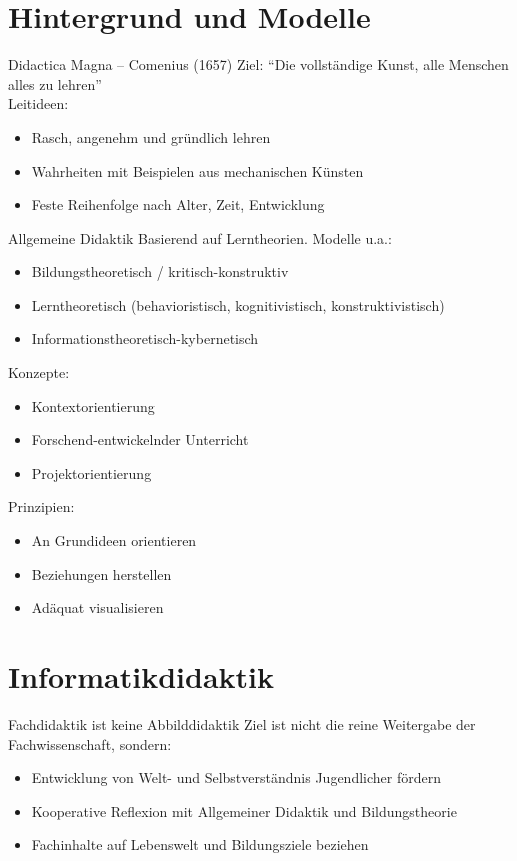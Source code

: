 \documentclass{article}
\begin{document}
\section{Hintergrund und Modelle}
\begin{block}{Didactica Magna – Comenius (1657)}
    Ziel: ``Die vollständige Kunst, alle Menschen alles zu lehren'' \\
    Leitideen:
    \begin{itemize}
        \item Rasch, angenehm und gründlich lehren
        \item Wahrheiten mit Beispielen aus mechanischen Künsten
        \item Feste Reihenfolge nach Alter, Zeit, Entwicklung
    \end{itemize}
\end{block}

\begin{block}{Allgemeine Didaktik}
    Basierend auf Lerntheorien. Modelle u.a.:
    \begin{itemize}
        \item Bildungstheoretisch / kritisch-konstruktiv
        \item Lerntheoretisch (behavioristisch, kognitivistisch, konstruktivistisch)
        \item Informationstheoretisch-kybernetisch
    \end{itemize}
    Konzepte:
    \begin{itemize}
        \item Kontextorientierung
        \item Forschend-entwickelnder Unterricht
        \item Projektorientierung
    \end{itemize}
    Prinzipien:
    \begin{itemize}
        \item An Grundideen orientieren
        \item Beziehungen herstellen
        \item Adäquat visualisieren
    \end{itemize}
\end{block}

\section{Informatikdidaktik}
\begin{block}{Fachdidaktik ist keine Abbilddidaktik}
    Ziel ist nicht die reine Weitergabe der Fachwissenschaft, sondern:
    \begin{itemize}
        \item Entwicklung von Welt- und Selbstverständnis Jugendlicher fördern
        \item Kooperative Reflexion mit Allgemeiner Didaktik und Bildungstheorie
        \item Fachinhalte auf Lebenswelt und Bildungsziele beziehen
    \end{itemize}
\end{block}
\end{document}

